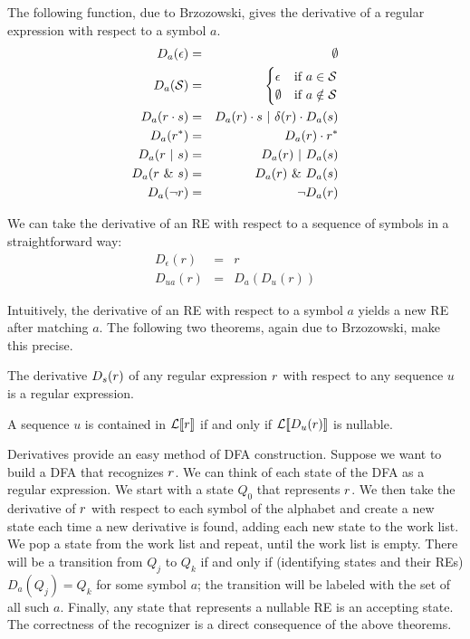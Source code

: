 The following function, due to Brzozowski, gives the derivative of a regular expression with respect to a symbol $a$.  
\begin{eqnarray*}
D_a (\epsilon)  &=& \emptyset \\
D_a (\mathcal{S})         &=& 
    \begin{cases}
        \epsilon & \textrm{if} \ a \in \mathcal{S} \\
        \emptyset & \textrm{if} \ a \notin \mathcal{S} \\
    \end{cases} \\
D_a (r \cdot s) &=& D_a(r)\cdot s \ | \  \delta(r) \cdot D_a(s) \\
D_a (r^*)       &=& D_a(r) \cdot r^* \\
D_a (r \ | \  s)   &=& D_a(r) \ | \  D_a(s) \\
D_a (r \ \& \  s)  &=& D_a(r) \ \& \  D_a(s) \\
D_a (\neg r)    &=& \neg D_a(r)
\end{eqnarray*}

We can take the derivative of an RE with respect to a sequence of symbols in a straightforward way:
\begin{eqnarray*}
D_\epsilon (r) &=& r \\
D_{ua} (r) &=& D_a(D_u(r))
\end{eqnarray*}

Intuitively, the derivative of an RE with respect to a symbol $a$ yields a new RE after matching $a$.  The following two theorems, again due to Brzozowski, make this precise.

\begin{theorem} The derivative $D_s(r)$ of any regular expression $r$ with respect to any sequence $u$ is a regular expression.
\end{theorem}

\begin{theorem} A sequence $u$ is contained in $\mathcal{L}[ \! [ r ] \! ]$ if and only if $\mathcal{L}[ \! [ D_u(r) ] \! ]$ is nullable.
\end{theorem}

Derivatives provide an easy method of DFA construction.  Suppose we want to build a DFA that recognizes $r$.  We can think of each state of the DFA as a regular expression.  We start with a state $Q_0$ that represents $r$.  We then take the derivative of $r$ with respect to each symbol of the alphabet and create a new state each time a new derivative is found, adding each new state to the work list.  We pop a state from the work list and repeat, until the work list is empty.  There will be a transition from $Q_j$ to $Q_k$ if and only if (identifying states and their REs) $D_a (Q_j) = Q_k$ for some symbol $a$; the transition will be labeled with the set of all such $a$.  Finally, any state that represents a nullable RE is an accepting state.  The correctness of the recognizer is a direct consequence of the above theorems.


